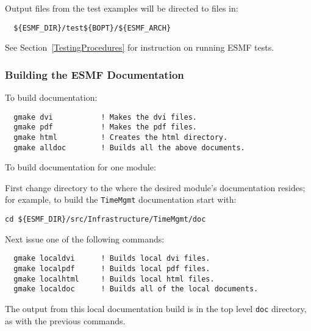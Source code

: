 Output files from the test examples will be directed to files in:
\begin{verbatim}
  ${ESMF_DIR}/test${BOPT}/${ESMF_ARCH}
\end{verbatim}

See Section~\ref{TestingProcedures} for instruction on running ESMF tests.

\subsubsection{Building the ESMF Documentation}
\label{BuildDocumentation}

\noindent To build documentation:
\begin{verbatim}
  gmake dvi           ! Makes the dvi files.
  gmake pdf           ! Makes the pdf files.
  gmake html          ! Creates the html directory.
  gmake alldoc        ! Builds all the above documents.
\end{verbatim}

\noindent To build documentation for one module:

\noindent First change directory to the where the desired module's documentation resides;  for
example, to build the {\tt TimeMgmt} documentation start with:

\begin{verbatim}
cd ${ESMF_DIR}/src/Infrastructure/TimeMgmt/doc
\end{verbatim}

\noindent Next issue one of the following commands:
\begin{verbatim}
  gmake localdvi      ! Builds local dvi files.
  gmake localpdf      ! Builds local pdf files.
  gmake localhtml     ! Builds local html files.
  gmake localdoc      ! Builds all of the local documents.
\end{verbatim}

\noindent The output from this local documentation build is in the top level {\tt doc}
directory, as with the previous commands.






